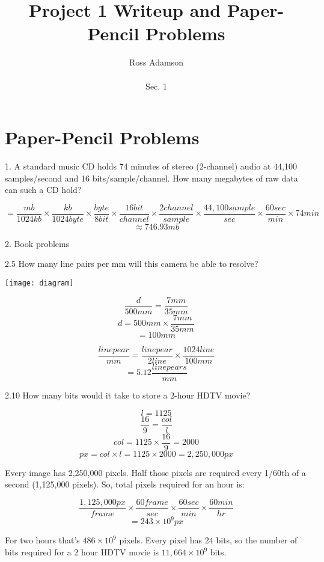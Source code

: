 \documentclass[11pt]{article}  %
\begin{document}

\title{Project 1 Writeup and Paper-Pencil Problems}

\author{Ross Adamson \\
\\
        Sec. 1}

\maketitle

\section{Paper-Pencil Problems}

1. A standard music CD holds 74 minutes of stereo (2-channel) audio at 44,100 samples/second and 16 bits/sample/channel. How many megabytes of raw data can such a CD hold?

\[= \frac{mb}{1024kb} \times \frac{kb}{1024byte} \times \frac{byte}{8bit}
\times \frac{16bit}{channel} \times \frac{2channel}{sample}
\times \frac{44,100sample}{sec} \times \frac{60sec}{min}
\times 74min\]
\[\approx 746.93mb\]

2. Book problems

2.5 How many line pairs per mm will this camera be able to resolve?

\texttt{[image: diagram]}

\[\frac{d}{500mm} = \frac{7mm}{35mm}\]
\[d = 500mm \times \frac{7mm}{35mm}\]
\[= 100mm\]

\[\frac{linepear}{mm} = \frac{linepear}{2line}
\times \frac{1024line}{100mm}\]
\[= 5.12 \frac{linepears}{mm}\]

2.10 How many bits would it take to store a 2-hour HDTV movie?

\[l = 1125\]
\[\frac{16}{9} = \frac{col}{l}\]
\[col = 1125 \times \frac{16}{9} = 2000\]
\[px = col \times l = 1125 \times 2000 = 2,250,000px\]

Every image has 2,250,000 pixels. Half those pixels are required
every 1/60th of a second (1,125,000 pixels). So, total pixels required
for an hour is:

\[\frac{1,125,000px}{frame} \times \frac{60frame}{sec} \times
\frac{60sec}{min} \times \frac{60min}{hr}\]
\[= 243 \times 10^9px\]

For two hours that's $486 \times 10^9$ pixels. Every pixel has 24 bits, 
so the number of bits required for a 2 hour
HDTV movie is $11,664 \times 10^9$ bits.
\end{document}
